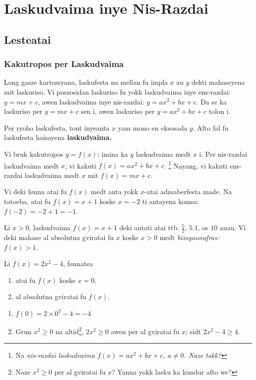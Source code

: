 \chapter{Laskudvaima inye Nis-Razdai}

\section{Lesteatai}

\subsection{Kakutropos per Laskudvaima}
Long gasze kartezsyana, laskufesta na mellan fu impla $x$ au $y$ dekti mahaseyena mit laskuriso.
Vi poszosidan laskuriso fu yokk laskudvaima inye ens-razdai: $y = mx + c$, awen laskudvaima inye
nis-razdai: $y = ax^2 + bx + c$. Da se ka laskuriso per $y = mx + c$ sen i, awen laskuriso per
$y = ax^2 + bx + c$ tolon i.

Per ryoho laskufesta, tont inyeanta $x$ yam mono en eksosada $y$.
Afto fal fu laskufesta haisayena \bf{laskudvaima}.

Vi bruk kakutropos $y = f\left(x\right)$: imina ka $y$ laskudvaima medt $x$ i.
Per nis-razdai laskudvaima medt $x$, vi kakuti
$f\left(x\right) = ax^2 + bx + c$. \footnote{Na \it{nis-razdai} laskudvaima $f\left(x\right)=ax^2+bx+c$, $a\neq0$. Naze takk?}
Nayang, vi kakuti ens-razdai laskudvaima medt $x$ mit $f\left(x\right) = mx + c$.

Vi deki fønna atai fu $f\left(x\right)$ medt anta yokk $x$-atai adzsaberfesta made.
Na tatoeba, atai fu $f\left(x\right) = x + 1$ koske $x = -2$ ti antayena komsa: $f\left(-2\right)=-2+1=-1$.

Li $x > 0$, laskudvaima $f\left(x\right) = x + 1$ deki antati atai ttb. $\frac{5}{2}$, $5.1$, os $10$ auau.
Vi deki mahase al absolutna gviratai fu $x$ koske $x > 0$ medt \it{bizsyaunafras}: $f\left(x\right) > 1$.

\begin{tatoeba}
  Li $f\left(x\right)=2x^2-4$, fønnatsa
  \begin{enumerate}
    \item atai fu $f\left(x\right)$ koske $x=0$,
    \item al absolutna gviratai fu $f\left(x\right)$.
  \end{enumerate}
\end{tatoeba}

\begin{svarna}
  \begin{enumerate}
    \item $f\left(0\right) = 2\times0^2 - 4 = -4$
    \item Grun $x^2\geq0$ na altid\footnote{Naze $x^2\geq0$ per al gviratai fu $x$? Yanna yokk lasku ka kundur afto we?}, $2x^2\geq0$ awen per al gviratai fu $x$; sidt $2x^2-4\geq4$.
  \end{enumerate}
\end{svarna}

